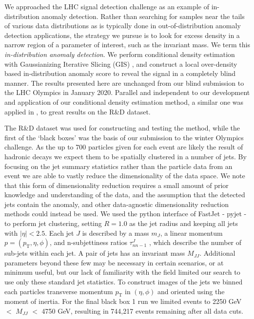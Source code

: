 \documentclass[a4paper,11pt]{article}
\begin{document}
\noindent We approached the LHC signal detection challenge as an example of in-distribution anomaly detection. Rather than searching for samples near the tails of various data distributions as is typically done in out-of-distribution anomaly detection applications, 
the strategy we pursue is to look for excess density in a narrow region of a parameter of interest, such as 
the invariant mass. We term this {\textit{in-distribution anomaly detection}}. We perform conditional density estimation with Gaussianizing Iterative Slicing (GIS) \cite{sig}, and construct a local over-density based in-distribution anomaly score to reveal the signal in a completely blind manner. The results presented here are unchanged from our blind submission to the LHC Olympics in January 2020. 
Parallel and independent to our development and application of our conditional density estimation method, a similar one was applied in \cite{Nachman:2020lpy}, to great results on the R\&D dataset.

The R\&D dataset \cite{lhc_randd} was used for constructing and testing the method, while the first of the `black boxes' \cite{lhc_bb1} was the basis of our submission to the winter Olympics challenge. As the up to 700 particles given for each event are likely the result of hadronic decays we expect them to be spatially clustered in a number of jets. By focusing on the jet summary statistics rather than the particle data from an event we are able to vastly reduce the dimensionality of the data space. We note that this form of dimensionality reduction requires a small amount of prior knowledge and understanding of the data, and the assumption that the detected jets contain the anomaly, and other data-agnostic dimensionality reduction methods could instead be used. We used the python interface of FastJet \cite{Cacciari:2011ma,Cacciari:2005hq} - pyjet \cite{pyjet} - to perform jet clustering, setting $R=1.0$ as the jet radius and keeping all jets with $|\eta| < 2.5$. Each jet $J$ is described by a mass $m_J$, a linear momentum $p=(p_\text{T}, \eta, \phi)$, and n-subjettiness ratios $\tau^J_{n n-1}$ \cite{Thaler:2010tr,Thaler:2011gf}, which describe the number of sub-jets within each jet. A pair of jets has an invariant mass $M_{JJ}$. Additional parameters beyond these few may be necessary in certain scenarios, or at minimum useful, but our lack of familiarity with the field limited our search to use only these standard jet statistics. To construct images of the jets we binned each particles transverse momentum $p_\text{T}$ in $(\eta,\phi)$ and oriented using the moment of inertia. For the final black box 1 run we limited events to 2250 GeV $<$ $M_{JJ}$ $<$ 4750 GeV, resulting in 744,217 events remaining after all data cuts. 
\end{document}

